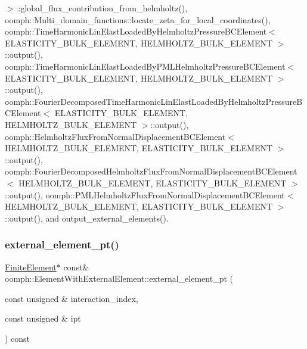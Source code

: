 $>$\+::global\+\_\+flux\+\_\+contribution\+\_\+from\+\_\+helmholtz(), oomph\+::\+Multi\+\_\+domain\+\_\+functions\+::locate\+\_\+zeta\+\_\+for\+\_\+local\+\_\+coordinates(), oomph\+::\+Time\+Harmonic\+Lin\+Elast\+Loaded\+By\+Helmholtz\+Pressure\+B\+C\+Element$<$ E\+L\+A\+S\+T\+I\+C\+I\+T\+Y\+\_\+\+B\+U\+L\+K\+\_\+\+E\+L\+E\+M\+E\+N\+T, H\+E\+L\+M\+H\+O\+L\+T\+Z\+\_\+\+B\+U\+L\+K\+\_\+\+E\+L\+E\+M\+E\+N\+T $>$\+::output(), oomph\+::\+Time\+Harmonic\+Lin\+Elast\+Loaded\+By\+P\+M\+L\+Helmholtz\+Pressure\+B\+C\+Element$<$ E\+L\+A\+S\+T\+I\+C\+I\+T\+Y\+\_\+\+B\+U\+L\+K\+\_\+\+E\+L\+E\+M\+E\+N\+T, H\+E\+L\+M\+H\+O\+L\+T\+Z\+\_\+\+B\+U\+L\+K\+\_\+\+E\+L\+E\+M\+E\+N\+T $>$\+::output(), oomph\+::\+Fourier\+Decomposed\+Time\+Harmonic\+Lin\+Elast\+Loaded\+By\+Helmholtz\+Pressure\+B\+C\+Element$<$ E\+L\+A\+S\+T\+I\+C\+I\+T\+Y\+\_\+\+B\+U\+L\+K\+\_\+\+E\+L\+E\+M\+E\+N\+T, H\+E\+L\+M\+H\+O\+L\+T\+Z\+\_\+\+B\+U\+L\+K\+\_\+\+E\+L\+E\+M\+E\+N\+T $>$\+::output(), oomph\+::\+Helmholtz\+Flux\+From\+Normal\+Displacement\+B\+C\+Element$<$ H\+E\+L\+M\+H\+O\+L\+T\+Z\+\_\+\+B\+U\+L\+K\+\_\+\+E\+L\+E\+M\+E\+N\+T, E\+L\+A\+S\+T\+I\+C\+I\+T\+Y\+\_\+\+B\+U\+L\+K\+\_\+\+E\+L\+E\+M\+E\+N\+T $>$\+::output(), oomph\+::\+Fourier\+Decomposed\+Helmholtz\+Flux\+From\+Normal\+Displacement\+B\+C\+Element$<$ H\+E\+L\+M\+H\+O\+L\+T\+Z\+\_\+\+B\+U\+L\+K\+\_\+\+E\+L\+E\+M\+E\+N\+T, E\+L\+A\+S\+T\+I\+C\+I\+T\+Y\+\_\+\+B\+U\+L\+K\+\_\+\+E\+L\+E\+M\+E\+N\+T $>$\+::output(), oomph\+::\+P\+M\+L\+Helmholtz\+Flux\+From\+Normal\+Displacement\+B\+C\+Element$<$ H\+E\+L\+M\+H\+O\+L\+T\+Z\+\_\+\+B\+U\+L\+K\+\_\+\+E\+L\+E\+M\+E\+N\+T, E\+L\+A\+S\+T\+I\+C\+I\+T\+Y\+\_\+\+B\+U\+L\+K\+\_\+\+E\+L\+E\+M\+E\+N\+T $>$\+::output(), and output\+\_\+external\+\_\+elements().

\mbox{\label{classoomph_1_1ElementWithExternalElement_a1207eae30d379008502855f6a40021ab}} 
\subsubsection{\texorpdfstring{external\+\_\+element\+\_\+pt()}{external\_element\_pt()}\hspace{0.1cm}{\footnotesize\ttfamily [2/2]}}
{\footnotesize\ttfamily \hyperlink{classoomph_1_1FiniteElement}{Finite\+Element}$\ast$ const\& oomph\+::\+Element\+With\+External\+Element\+::external\+\_\+element\+\_\+pt (\begin{DoxyParamCaption}\item[{const unsigned \&}]{interaction\+\_\+index,  }\item[{const unsigned \&}]{ipt }\end{DoxyParamCaption}) const\hspace{0.3cm}{\ttfamily [inline]}}



